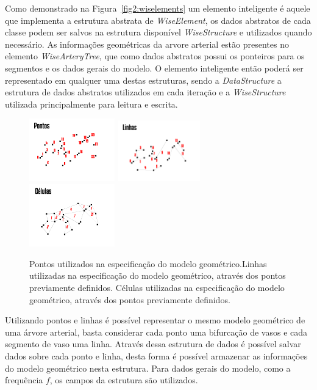 \documentclass[
        english,			
        brazil			        %
        ,<...>]{abntbibufjf}
\begin{document}
 Como demonstrado na Figura~\ref{fig2:wiselements} um elemento inteligente é aquele que implementa a estrutura abstrata de \textit{WiseElement}, os dados abstratos de cada classe podem ser salvos na estrutura disponível \textit{WiseStructure} e utilizados quando necessário. As informações geométricas da arvore arterial estão presentes no elemento \textit{WiseArteryTree}, que como dados abstratos possui os ponteiros para os segmentos e os dados gerais do modelo.
O elemento inteligente então poderá ser representado em qualquer uma destas estruturas, sendo a \textit{DataStructure} a estrutura de dados abstratos utilizados em cada iteração e a \textit{WiseStructure} utilizada principalmente para leitura e escrita.

\begin{figure}[!htbp]
	\includegraphics[width=0.33\textwidth,left]{Figures/WiseElementPoints.png}
	\includegraphics[width=0.32\textwidth,center]{Figures/WiseElementLines.png}
	\includegraphics[width=0.33\textwidth,right]{Figures/WiseElementCells.png}
	\caption{Pontos utilizados na especificação do modelo geométrico.Linhas utilizadas na especificação do modelo geométrico, através dos pontos previamente definidos. Células utilizadas na especificação do modelo geométrico, através dos pontos previamente definidos.}
	\label{fig2:wiselementstructs}
\end{figure}

Utilizando pontos e linhas é possível representar o mesmo modelo geométrico de uma árvore arterial, basta considerar cada ponto uma bifurcação de vasos e cada segmento de vaso uma linha. Através dessa estrutura de dados é possível salvar dados sobre cada ponto e linha, desta forma é possível armazenar as informações do modelo geométrico nesta estrutura. Para dados gerais do modelo, como a frequência $f$, os campos da estrutura são utilizados.
\end{document}
